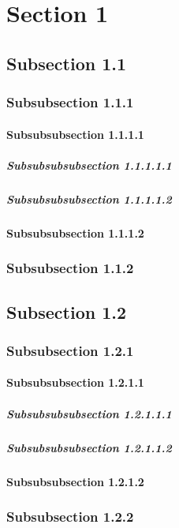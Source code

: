 \documentclass{article}
\begin{document}
\section{Section 1}
\subsection{Subsection 1.1}
\subsubsection{Subsubsection 1.1.1}
\paragraph{Subsubsubsection 1.1.1.1}
\subparagraph{Subsubsubsubsection 1.1.1.1.1}
\subparagraph{Subsubsubsubsection 1.1.1.1.2}
\paragraph{Subsubsubsection 1.1.1.2}
\subsubsection{Subsubsection 1.1.2}
\subsection{Subsection 1.2}
\subsubsection{Subsubsection 1.2.1}
\paragraph{Subsubsubsection 1.2.1.1}
\subparagraph{Subsubsubsubsection 1.2.1.1.1}
\subparagraph{Subsubsubsubsection 1.2.1.1.2}
\paragraph{Subsubsubsection 1.2.1.2}
\subsubsection{Subsubsection 1.2.2}
\end{document}
